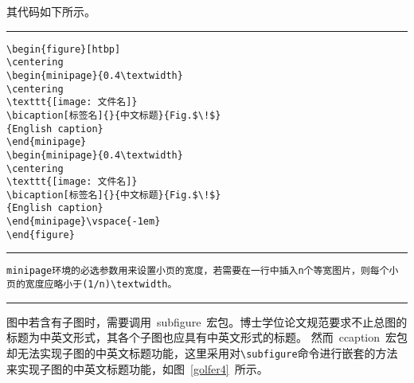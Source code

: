 其代码如下所示。
\vspace{1em}\noindent\hrule
\begin{lstlisting}
\begin{figure}[htbp]
\centering
\begin{minipage}{0.4\textwidth}
\centering
\texttt{[image: 文件名]}
\bicaption[标签名]{}{中文标题}{Fig.$\!$}
{English caption}
\end{minipage}
\begin{minipage}{0.4\textwidth}
\centering
\texttt{[image: 文件名]}
\bicaption[标签名]{}{中文标题}{Fig.$\!$}
{English caption}
\end{minipage}\vspace{-1em}
\end{figure}
\end{lstlisting}
\noindent\hrule
\begin{lstlisting}
minipage环境的必选参数用来设置小页的宽度，若需要在一行中插入n个等宽图片，则每个小页的宽度应略小于(1/n)\textwidth。
\end{lstlisting}
\noindent\hrule


图中若含有子图时，需要调用~subfigure~宏包。博士学位论文规范要求不止总图的标题为中英文形式，其各个子图也应具有中英文形式的标题。
然而~ccaption~宏包却无法实现子图的中英文标题功能，这里采用对\verb|\subfigure|命令进行嵌套的方法来实现子图的中英文标题功能，如图~\ref{golfer4}~所示。

\begin{figure}[htbp]
	\centering
	\subfigure{\label{golfer41}}\addtocounter{subfigure}{-2}
	\subfigure{\label{golfer42}}\addtocounter{subfigure}{-2}
	\vspace{-1em}
\end{figure}

